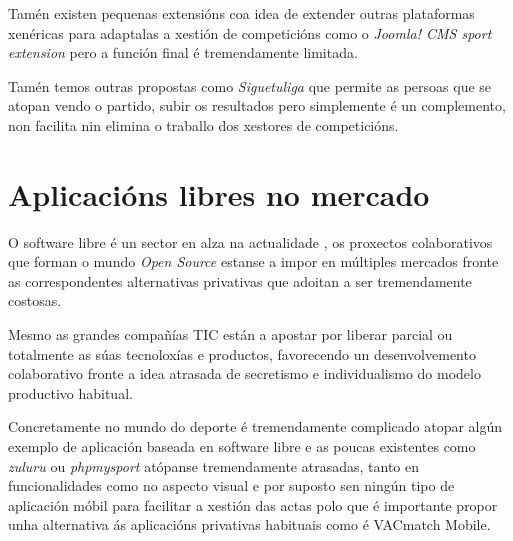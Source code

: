     Tamén existen pequenas extensións coa idea de extender outras plataformas xenéricas 
para adaptalas a xestión de competicións como o \emph{Joomla! CMS sport extension} pero a 
función final é tremendamente limitada.
  
    Tamén temos outras propostas como \emph{Siguetuliga} que permite as persoas que 
se atopan vendo o partido, subir os resultados pero simplemente é un complemento, non 
facilita nin elimina o traballo dos xestores de competicións.

  \section{Aplicacións libres no mercado}
  
  O software libre é un sector en alza na actualidade%
  , %
  os proxectos colaborativos que forman o mundo \emph{Open Source} estanse a impor en
  múltiples mercados fronte as correspondentes alternativas privativas que adoitan a ser
  tremendamente costosas.%

    Mesmo as grandes compañías TIC están a apostar por liberar parcial ou totalmente as 
súas tecnoloxías e productos, favorecendo un desenvolvemento colaborativo fronte a idea 
atrasada de secretismo e individualismo do modelo productivo habitual.%


Concretamente no mundo do deporte é tremendamente complicado atopar algún exemplo de
aplicación baseada en software libre e as poucas existentes como \emph{zuluru} ou
\emph{phpmysport} atópanse tremendamente atrasadas, tanto en funcionalidades como no
aspecto visual e por suposto sen ningún tipo de aplicación móbil para facilitar a
xestión das actas polo que é importante propor unha alternativa ás aplicacións
privativas habituais como é VACmatch Mobile.

